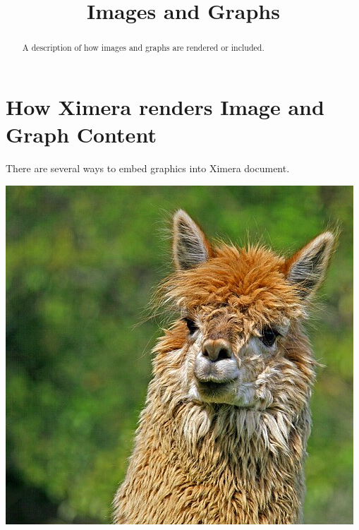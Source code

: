 \documentclass{ximera}
\title{Images and Graphs}
\begin{document}
\begin{abstract}
    A description of how images and graphs are rendered or included.
\end{abstract}
\maketitle
   
\section*{How Ximera renders Image and Graph Content}

There are several ways to embed graphics into Ximera document. 

\begin{center}
  \includegraphics{llama.jpg}
\end{center}
\end{document}
